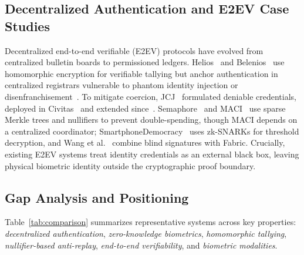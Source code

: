 \documentclass[10pt,letterpaper,journal]{IEEEtran}
\begin{document}
\subsection{Decentralized Authentication and E2EV Case Studies}
\label{subsec:rel_e2ev}
Decentralized end-to-end verifiable (E2EV) protocols have evolved from centralized bulletin boards to permissioned ledgers. Helios~\cite{Adida2008} and Belenios~\cite{Cortier2019} use homomorphic encryption for verifiable tallying but anchor authentication in centralized registrars vulnerable to phantom identity injection or disenfranchisement~\cite{Jones2012,NASEM2018}. To mitigate coercion, JCJ~\cite{Juels2005} formulated deniable credentials, deployed in Civitas~\cite{Civitas2008} and extended since~\cite{eprint2023_1578,Kho2025}. Semaphore~\cite{Gurkan2020} and MACI~\cite{Buterin2020} use sparse Merkle trees and nullifiers to prevent double-spending, though MACI depends on a centralized coordinator; SmartphoneDemocracy~\cite{Jozwik2025} uses zk-SNARKs for threshold decryption, and Wang et al.~\cite{Wang2024} combine blind signatures with Fabric. Crucially, existing E2EV systems treat identity credentials as an external black box, leaving physical biometric identity outside the cryptographic proof boundary.

\subsection{Gap Analysis and Positioning}
\label{subsec:rel_gap}

Table~\ref{tab:comparison} summarizes representative systems across key properties: \emph{decentralized authentication}, \emph{zero-knowledge biometrics}, \emph{homomorphic tallying}, \emph{nullifier-based anti-replay}, \emph{end-to-end verifiability}, and \emph{biometric modalities}.
\end{document}
